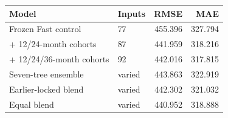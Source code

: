 \begin{tabular}{llrr}
\toprule
Model & Inputs & RMSE & MAE \\
\midrule
Frozen Fast control & 77 & 455.396 & 327.794 \\
+ 12/24-month cohorts & 87 & 441.959 & 318.216 \\
+ 12/24/36-month cohorts & 92 & 442.016 & 317.815 \\
Seven-tree ensemble & varied & 443.863 & 322.919 \\
Earlier-locked blend & varied & 442.302 & 321.032 \\
Equal blend & varied & 440.952 & 318.888 \\
\bottomrule
\end{tabular}
